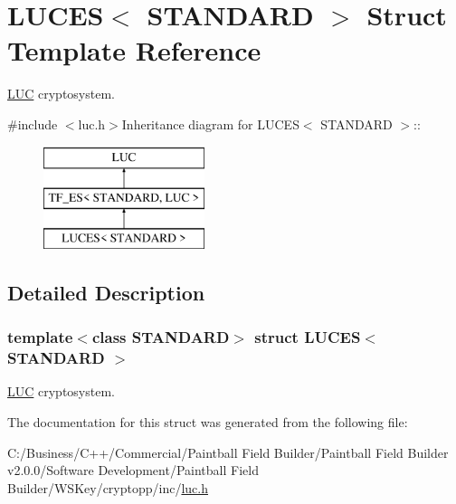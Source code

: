 \hypertarget{struct_l_u_c_e_s}{
\section{LUCES$<$ STANDARD $>$ Struct Template Reference}
\label{struct_l_u_c_e_s}
}


\hyperlink{struct_l_u_c}{LUC} cryptosystem.  


{\ttfamily \#include $<$luc.h$>$}Inheritance diagram for LUCES$<$ STANDARD $>$::\begin{figure}[H]
\begin{center}
\leavevmode
\includegraphics[height=3cm]{struct_l_u_c_e_s}
\end{center}
\end{figure}


\subsection{Detailed Description}
\subsubsection*{template$<$class STANDARD$>$ struct LUCES$<$ STANDARD $>$}

\hyperlink{struct_l_u_c}{LUC} cryptosystem. 

The documentation for this struct was generated from the following file:\begin{DoxyCompactItemize}
\item 
C:/Business/C++/Commercial/Paintball Field Builder/Paintball Field Builder v2.0.0/Software Development/Paintball Field Builder/WSKey/cryptopp/inc/\hyperlink{luc_8h}{luc.h}\end{DoxyCompactItemize}
